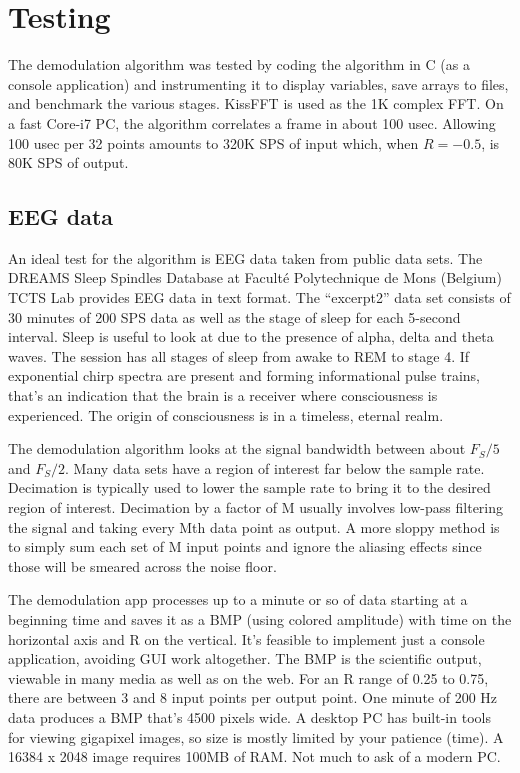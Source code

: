 \section{Testing}

The demodulation algorithm was tested by coding the algorithm in C (as a console
application) and instrumenting it to display variables,
save arrays to files, and benchmark the various stages.
KissFFT is used as the 1K complex FFT.
On a fast Core-i7 PC, the algorithm correlates a frame in about 100 usec.
Allowing 100 usec per 32 points amounts to 320K SPS of input which, when $R=-0.5$,
is 80K SPS of output.

\subsection{EEG data}

An ideal test for the algorithm is EEG data taken from public data sets.
The DREAMS Sleep Spindles Database at Facult\'e Polytechnique de Mons (Belgium)
TCTS Lab \cite{Devuyst} provides EEG data in text format. 
The ``excerpt2'' data set consists of 30 minutes of 200 SPS data as well as the
stage of sleep for each 5-second interval.
Sleep is useful to look at due to the presence of alpha, delta and theta waves. 
The session has all stages of sleep from awake to REM to stage 4.
If exponential chirp spectra are present and forming informational pulse trains,
that's an indication that the brain is a receiver where consciousness is
experienced. The origin of consciousness is in a timeless, eternal realm.

The demodulation algorithm looks at the signal bandwidth between about
$F_S/5$ and $F_S/2$.
Many data sets have a region of interest far below the sample rate.
Decimation is typically used to lower the sample rate to bring it to the
desired region of interest. 
Decimation by a factor of M usually involves low-pass filtering the signal
and taking every Mth data point as output.
A more sloppy method is to simply sum each set of M input points and ignore
the aliasing effects since those will be smeared across the noise floor.

The demodulation app processes up to a minute or so of data starting at a 
beginning time and saves it as a BMP (using colored amplitude) with time on the
horizontal axis and R on the vertical.
It's feasible to implement just a console application,
avoiding GUI work altogether.
The BMP is the scientific output, viewable in many media as well as on the web.
For an R range of 0.25 to 0.75, there are between 3 and 8 input points per 
output point.
One minute of 200 Hz data produces a BMP that's 4500 pixels wide.
A desktop PC has built-in tools for viewing gigapixel images,
so size is mostly limited by your patience (time).
A 16384 x 2048 image requires 100MB of RAM. Not much to ask of a modern PC.

